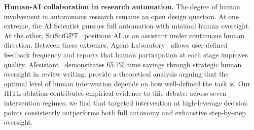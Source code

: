 \documentclass{llmxive}
\begin{document}
\noindent \textbf{Human-AI collaboration in research automation.}
The degree of human involvement in autonomous research remains an open design question. At one extreme, the AI Scientist pursues full automation with minimal human oversight. At the other, SciSciGPT~\citep{shao2025sciscigpt} positions AI as an assistant under continuous human direction. Between these extremes, Agent Laboratory~\citep{schmidgall2025agentlab} allows user-defined feedback frequency and reports that human participation at each stage improves quality. AIssistant~\citep{gaddipati2025aissistant} demonstrates 65.7\% time savings through strategic human oversight in review writing. \citet{natarajan2024hitl} provide a theoretical analysis arguing that the optimal level of human intervention depends on how well-defined the task is. Our HITL ablation contributes empirical evidence to this debate: across seven intervention regimes, we find that targeted intervention at high-leverage decision points consistently outperforms both full autonomy and exhaustive step-by-step oversight.
\end{document}
